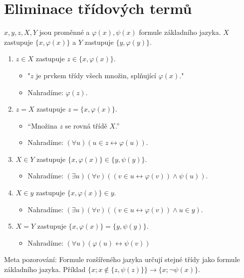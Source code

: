 \section{Eliminace třídových termů}

$x,y,z,X,Y$ jsou proměnné a $\varphi(x), \psi(x)$ formule základního jazyka. $X$ zastupuje \newline $\{x, \varphi(x)\}$ a $Y$ zastupuje $\{y, \varphi(y)\}$.

\begin{enumerate}
	\item $z \in X$ zastupuje $z \in \{x, \varphi(x)\}$.
	\begin{itemize}
		\item "$z$ je prvkem třídy všech množin, splňující $\varphi(x)$."
		\item Nahradíme: $\varphi (z)$.
	\end{itemize}
	\item $z = X$ zastupuje $z = \{x, \varphi(x)\}$.
	\begin{itemize}
		\item “Množina $z$ se rovná třídě $X$.”
		\item Nahradíme: $(\forall u)( u \in z \leftrightarrow \varphi(u))$.
	\end{itemize}
	\item $X \in Y$ zastupuje $\{x, \varphi(x)\} \in \{y, \psi(y)\}$.
	\begin{itemize}
		\item Nahradíme: $(\exists u)(\forall v)((v \in u \leftrightarrow \varphi (v)) \land \psi(u))$.
	\end{itemize}
	\item $X \in y$ zastupuje $\{x, \varphi(x)\} \in y$.
	\begin{itemize}
		\item Nahradíme: $(\exists u)(\forall v)((v \in u \leftrightarrow \varphi (v)) \land u \in y)$.
	\end{itemize}
	\item $X = Y$ zastupuje $\{x, \varphi(x)\} = \{y, \psi(y)\}$.
	\begin{itemize}
		\item Nahradíme: $(\forall u)(\varphi(u) \leftrightarrow \psi(v))$
	\end{itemize}
\end{enumerate}

Meta pozorování: Formule rozšířeného jazyka určují stejné třídy jako formule základního jazyka. Příklad $\{x; x \notin \{z, \psi(z)\}\} \rightarrow \{x; \neg \psi(x)\}$.

